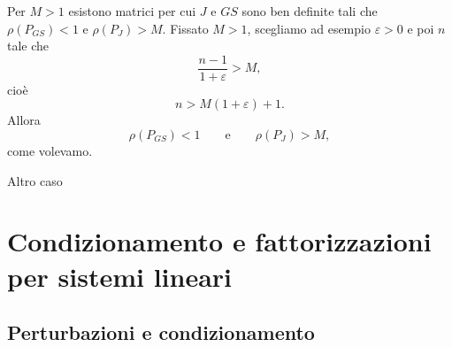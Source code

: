 \documentclass[a4paper]{article}
\begin{document}
\begin{snippetexercise}{
        Per \(M>1\) esistono matrici per cui \(J\) e \(GS\) sono ben definite tali che
        \(\rho(P_{GS}) < 1\) e \(\rho(P_J) > M\).
    }
    Fissato \(M>1\), scegliamo ad esempio \(\varepsilon>0\) e poi \(n\) tale che
    \[
        \frac{n-1}{1+\varepsilon}>M,
    \]
    cioè
    \[
        n>M(1+\varepsilon)+1.
    \]
    Allora
    \[
        \rho(P_{GS})<1
        \qquad\text{e}\qquad
        \rho(P_J)>M,
    \]
    come volevamo.
\end{snippetexercise}

\begin{snippetexercise}{Altro caso}
    \todo
\end{snippetexercise}

\section{Condizionamento e fattorizzazioni per sistemi lineari}

\subsection{Perturbazioni e condizionamento}
\end{document}
